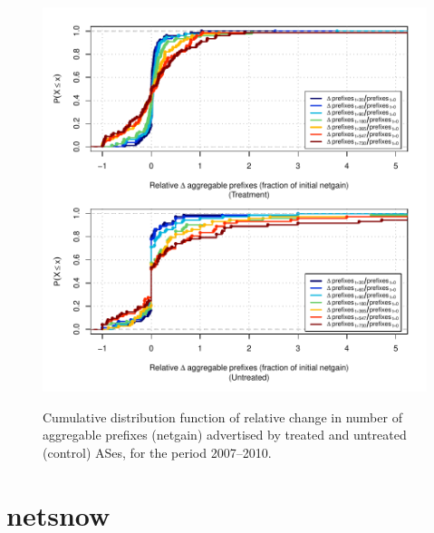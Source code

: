 \begin{figure}[H]
\begin{centering}
\begin{singlespace}
    \includegraphics[width=6in]{figures/behavior-rel_netgain-2007_2010-corr.pdf}
    \vspace{-2em}\\
    \caption{Cumulative distribution function of relative change in number of aggregable prefixes (netgain) advertised by treated and untreated (control) ASes, for the period 2007--2010.}
\end{singlespace}
\end{centering}
\end{figure}

\section{netsnow}

